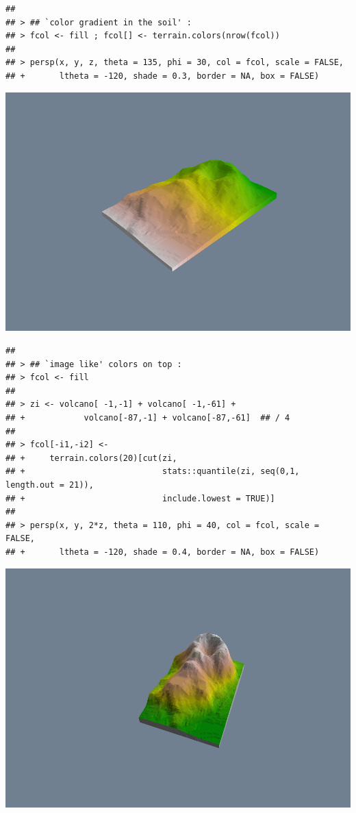 \documentclass[
]{book}
\begin{document}
\begin{verbatim}
## 
## > ## `color gradient in the soil' :
## > fcol <- fill ; fcol[] <- terrain.colors(nrow(fcol))
## 
## > persp(x, y, z, theta = 135, phi = 30, col = fcol, scale = FALSE,
## +       ltheta = -120, shade = 0.3, border = NA, box = FALSE)
\end{verbatim}

\includegraphics{TudodoR_files/figure-latex/unnamed-chunk-146-7.pdf}

\begin{verbatim}
## 
## > ## `image like' colors on top :
## > fcol <- fill
## 
## > zi <- volcano[ -1,-1] + volcano[ -1,-61] +
## +            volcano[-87,-1] + volcano[-87,-61]  ## / 4
## 
## > fcol[-i1,-i2] <-
## +     terrain.colors(20)[cut(zi,
## +                            stats::quantile(zi, seq(0,1, length.out = 21)),
## +                            include.lowest = TRUE)]
## 
## > persp(x, y, 2*z, theta = 110, phi = 40, col = fcol, scale = FALSE,
## +       ltheta = -120, shade = 0.4, border = NA, box = FALSE)
\end{verbatim}

\includegraphics{TudodoR_files/figure-latex/unnamed-chunk-146-8.pdf}
\end{document}

